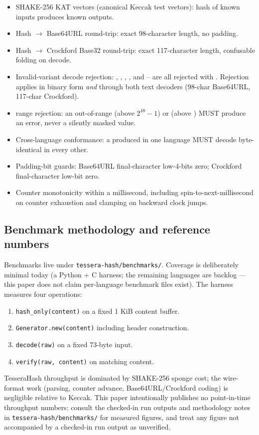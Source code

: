 \begin{itemize}
\item SHAKE-256 KAT vectors (canonical Keccak test vectors): hash of known inputs produces known outputs.
\item Hash $\to$ Base64URL round-trip: exact 98-character length, no padding.
\item Hash $\to$ Crockford Base32 round-trip: exact 117-character length, confusable folding on decode.
\item Invalid-variant decode rejection: , , , , and -- are all rejected with . Rejection applies in binary form \emph{and} through both text decoders (98-char Base64URL, 117-char Crockford).
\item {} range rejection: an out-of-range  (above $2^{48}-1$) or  (above ) MUST produce an error, never a silently masked value.
\item Cross-language conformance: a \tesserahash{} produced in one language MUST decode byte-identical in every other.
\item Padding-bit guards: Base64URL final-character low-4-bits zero; Crockford final-character low-bit zero.
\item Counter monotonicity within a millisecond, including spin-to-next-millisecond on counter exhaustion and clamping on backward clock jumps.
\end{itemize}

\subsection{Benchmark methodology and reference numbers}
\label{sec:conformance:bench}

Benchmarks live under \texttt{tessera-hash/benchmarks/}. Coverage is deliberately minimal today (a Python + C harness; the remaining languages are backlog --- this paper does not claim per-language benchmark files exist). The harness measures four operations:

\begin{enumerate}
\item \texttt{hash\_only(content)} on a fixed 1 KiB content buffer.
\item \texttt{Generator.new(content)} including header construction.
\item \texttt{decode(raw)} on a fixed 73-byte input.
\item \texttt{verify(raw, content)} on matching content.
\end{enumerate}

TesseraHash throughput is dominated by SHAKE-256 sponge cost; the wire-format work (parsing, counter advance, Base64URL/Crockford coding) is negligible relative to Keccak. This paper intentionally publishes no point-in-time throughput numbers: consult the checked-in run outputs and methodology notes in \texttt{tessera-hash/benchmarks/} for measured figures, and treat any figure not accompanied by a checked-in run output as unverified.
